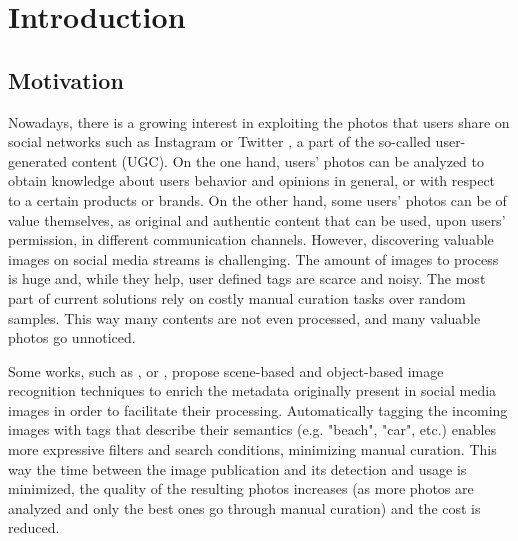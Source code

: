 
\chapter{Introduction}  %

\ifpdf
    \graphicspath{{Chapter1/Figs/Raster/}{Chapter1/Figs/PDF/}{Chapter1/Figs/}}
\else
    \graphicspath{{Chapter1/Figs/Vector/}{Chapter1/Figs/}}
\fi


\section{Motivation} %

Nowadays, there is a growing interest in exploiting the photos that users share on social networks such as Instagram or Twitter \cite{conf/bigdataconf/Tous16}, a part of the so-called user-generated content (UGC). On the one hand, users' photos can be analyzed to obtain knowledge about users behavior and opinions in general, or with respect to a certain products or brands. On the other hand, some users' photos can be of value themselves, as original and authentic content that can be used, upon users' permission, in different communication channels. However, discovering valuable images on social media streams is challenging. The amount of images to process is huge and, while they help, user defined tags are scarce and noisy. The most part of current solutions rely on costly manual curation tasks over random samples. This way many contents are not even processed, and many valuable photos go unnoticed. 

Some works, such as \cite{DBLP:journals/corr/ParkLK16}, \cite{conf/bigmm/TousTA15} or \cite{Denton:2015:UCH:2783258.2788576}, propose scene-based and object-based image recognition techniques to enrich the metadata originally present in social media images in order to facilitate their processing. Automatically tagging the incoming images with tags that describe their semantics (e.g. "beach", "car", etc.) enables more expressive filters and search conditions, minimizing manual curation. This way the time between the image publication and its detection and usage is minimized, the quality of the resulting photos increases (as more photos are analyzed and only the best ones go through manual curation) and the cost is reduced. 

